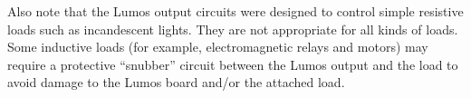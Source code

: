 \documentclass[letterpaper,twoside,onecolumn,openright,final]{memoir}
\begin{document}
Also note that the Lumos output circuits were designed to control simple resistive loads such as
incandescent lights.  They are not appropriate for all kinds of loads.  Some inductive loads
(for example, electromagnetic relays and motors) may require a protective ``snubber'' circuit
between the Lumos output and the load to avoid damage to the Lumos board and/or the attached load.

%
%
\end{document}
